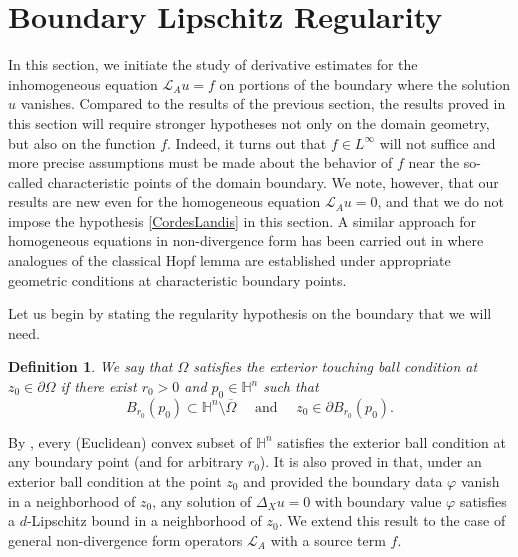 \documentclass[12pt]{amsart}
\newtheorem{Definition}[Theorem]{Definition}
\def \H {{\mathbb H}}
\def \Hn {{\mathbb H}^n}
\def \L {\mathcal{L}}
\def \O {\Omega}
\begin{document}

\section{Boundary Lipschitz Regularity}\label{sec:lipschitz}


In this section, we initiate the study of derivative estimates for the inhomogeneous equation $\L_A u = f$ on portions of the boundary where the solution $u$ vanishes. Compared to the results of the previous section, the results proved in this section will require stronger hypotheses not only on the domain geometry, but also on the function $f$. Indeed, it turns out that $f \in L^{\infty}$ will not suffice and more precise assumptions must be made about the behavior of $f$ near the so-called characteristic points of the domain boundary. We note, however, that our results are new even for the homogeneous equation $\L_A u = 0$, and that we do not impose the hypothesis \eqref{CordesLandis} in this section. A similar approach for homogeneous equations in non-divergence form has been carried out in \cite{MartinoTralli2016} where analogues of the classical Hopf lemma are established under appropriate geometric conditions at characteristic boundary points.

Let us begin by stating the regularity hypothesis on the boundary that we will need.

\begin{Definition}\label{extball}
We say that $\O$ satisfies the \emph{exterior touching ball condition} at $z_0\in\partial\O$ if there exist $r_0>0$ and $p_0\in\Hn$ such that 
\begin{equation}\label{touching}
B_{r_0}(p_0) \subset \Hn \setminus \overline{\O} \quad\mbox{ and }\quad z_0\in \partial B_{r_0}(p_0).
\end{equation}
\end{Definition}

By \cite[Remark 3.5]{Lanconelli-Uguzzoni-PoissonKernel}, every (Euclidean) convex subset of $\H^n$ satisfies the exterior ball condition at any boundary point (and for arbitrary $r_0$). It is also proved in \cite[Lemma 3.2]{Lanconelli-Uguzzoni-PoissonKernel} that, under an exterior ball condition at the point $z_0$ and provided the boundary data $\varphi$ vanish in a neighborhood of $z_0$, any solution of $\Delta_X u=0$ with boundary value $\varphi$ satisfies a $d$-Lipschitz bound in a neighborhood of $z_0$. We extend this result to the case of general non-divergence form operators $\L_A$ with a source term $f$. 
\end{document}
